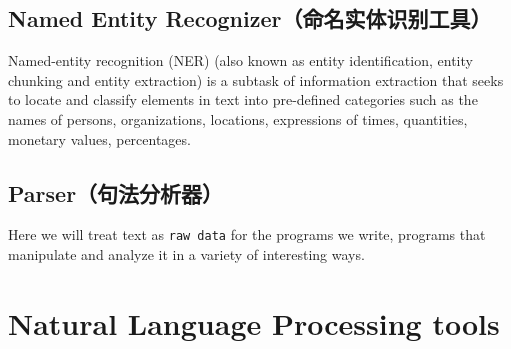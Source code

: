 \documentclass{article}
\begin{document}
\subsection{Named Entity
Recognizer（命名实体识别工具）}\label{named-entity-recognizerux547dux540dux5b9eux4f53ux8bc6ux522bux5de5ux5177}

Named-entity recognition (NER) (also known as entity identification,
entity chunking and entity extraction) is a subtask of information
extraction that seeks to locate and classify elements in text into
pre-defined categories such as the names of persons, organizations,
locations, expressions of times, quantities, monetary values,
percentages.

\subsection{Parser（句法分析器）}\label{parserux53e5ux6cd5ux5206ux6790ux5668}

    Here we will treat text as \texttt{raw data} for the programs we write,
programs that manipulate and analyze it in a variety of interesting
ways.

    \section{Natural Language Processing
tools}\label{natural-language-processing-tools}
\end{document}

